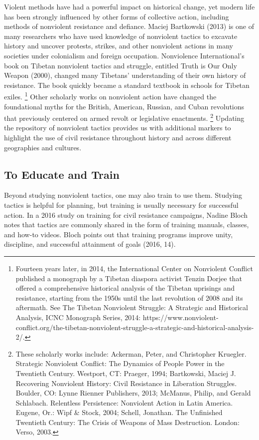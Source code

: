 \documentclass[twoside,a4paper,12pt,fleqn,openany]{extbook}
\begin{document}
Violent methods have had a powerful impact on historical change, yet modern life has been strongly influenced by other forms of collective action, including methods of nonviolent resistance and defiance.
Maciej Bartkowski (2013) is one of many researchers who have used knowledge of nonviolent tactics to excavate history and uncover protests, strikes, and other nonviolent actions in many societies under colonialism and foreign occupation.
Nonviolence International’s book on Tibetan nonviolent tactics and struggle, entitled Truth is Our Only Weapon (2000), changed many Tibetans’ understanding of their own history of resistance. The book quickly became a standard textbook in schools for Tibetan exiles.
\footnote{Fourteen years later, in 2014, the International Center on Nonviolent Conflict published a monograph by a Tibetan diaspora activist Tenzin Dorjee that offered a comprehensive historical analysis of the Tibetan uprisings and resistance, starting from the 1950s until the last revolution of 2008 and its aftermath. See The Tibetan Nonviolent Struggle: A Strategic and Historical Analysis, ICNC Monograph Series, 2014: https://www.nonviolent-conflict.org/the-tibetan-nonviolent-struggle-a-strategic-and-historical-analysis-2/.}
Other scholarly works on nonviolent action have changed the foundational myths for the British, American, Russian, and Cuban revolutions that previously centered on armed revolt or legislative enactments.
\footnote{These scholarly works include: Ackerman, Peter, and Christopher Kruegler. Strategic Nonviolent Conflict: The Dynamics of People Power in the Twentieth Century. Westport, CT: Praeger, 1994; Bartkowski, Maciej J. Recovering Nonviolent History: Civil Resistance in Liberation Struggles. Boulder, CO: Lynne Rienner Publishers, 2013; McManus, Philip, and Gerald Schlabach. Relentless Persistence: Nonviolent Action in Latin America. Eugene, Or.: Wipf & Stock, 2004; Schell, Jonathan. The Unfinished Twentieth Century: The Crisis of Weapons of Mass Destruction. London: Verso, 2003.}
Updating the repository of nonviolent tactics provides us with additional markers to highlight the use of civil resistance throughout history and across different geographies and cultures.

\subsection*{To Educate and Train}

Beyond studying nonviolent tactics, one may also train to use them. Studying tactics is helpful for planning, but training is usually necessary for successful action. In a 2016 study on training for civil resistance campaigns, Nadine Bloch notes that tactics are commonly shared in the form of training manuals, classes, and how-to videos. Bloch points out that training programs improve unity, discipline, and successful attainment of goals (2016, 14).
\end{document}
